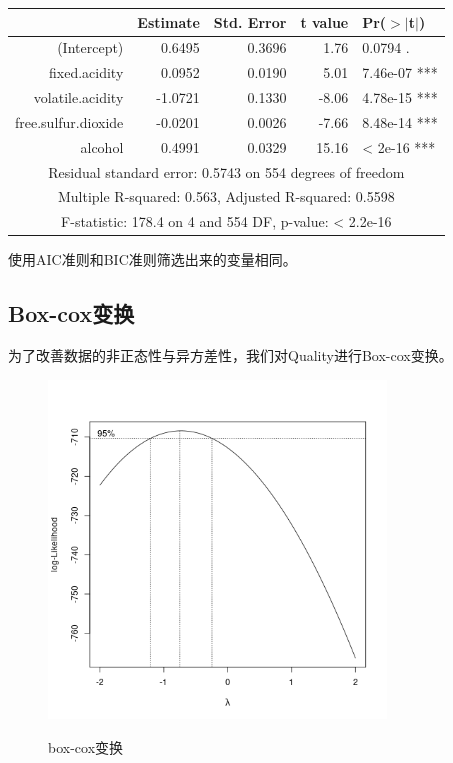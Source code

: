 \documentclass[fontset=ubuntu]{ctexart}
\begin{document}
                \begin{table}[ht]
                    \centering
                    \begin{tabular}{rrrrl}
                        \hline
                        & Estimate & Std. Error & t value & Pr($>$$|$t$|$) \\ 
                        \hline
                        (Intercept) & 0.6495 & 0.3696 & 1.76 & 0.0794 . \\ 
                        fixed.acidity & 0.0952 & 0.0190 & 5.01 & 7.46e-07 *** \\ 
                        volatile.acidity & -1.0721 & 0.1330 & -8.06 & 4.78e-15 *** \\ 
                        free.sulfur.dioxide & -0.0201 & 0.0026 & -7.66 & 8.48e-14 *** \\ 
                        alcohol & 0.4991 & 0.0329 & 15.16 & < 2e-16 *** \\ 
                        \hline
                        \multicolumn{5}{c}{Residual standard error: 0.5743 on 554 degrees of freedom} \\
                        \multicolumn{5}{c}{Multiple R-squared:  0.563,	Adjusted R-squared:  0.5598 } \\
                        \multicolumn{5}{c}{F-statistic: 178.4 on 4 and 554 DF,  p-value: < 2.2e-16} \\
                        \hline
                    \end{tabular}
                \end{table}

                使用AIC准则和BIC准则筛选出来的变量相同。
        
        \clearpage
        \subsection{Box-cox变换}
            为了改善数据的非正态性与异方差性，我们对Quality进行Box-cox变换。
            \begin{figure}[htbp]
                \centering
                \includegraphics[width=0.8\textwidth]{../figures/boxcox.png}
                \label{fig:boxcox}
                \caption{box-cox变换}
            \end{figure}
\end{document}
